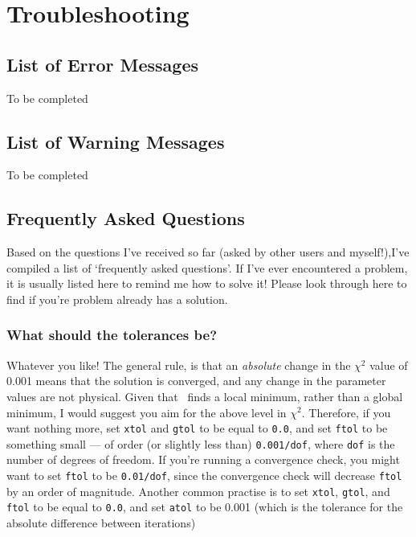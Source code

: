 \section{Troubleshooting}
\label{sec:troubleshoot}

\subsection{List of Error Messages}

To be completed

\subsection{List of Warning Messages}

To be completed

\subsection{Frequently Asked Questions}

Based on the questions I've received so far (asked by other
users and myself!),I've compiled a list of `frequently asked
questions'. If I've ever encountered a problem, it is usually
listed here to remind me how to solve it! Please look through
here to find if you're problem already has a solution.

\subsubsection{What should the tolerances be?}
Whatever you like! The general rule, is that an \textit{absolute}
change in the $\chi^{2}$ value of 0.001 means that the solution
is converged, and any change in the parameter values are not
physical. Given that \alis\ finds a local minimum, rather than a
global minimum, I would suggest you aim for the above level
in $\chi^{2}$. Therefore, if you want nothing more, set \texttt{xtol}
and \texttt{gtol} to be equal to \texttt{0.0}, and set \texttt{ftol} to be
something small --- of order (or slightly less than) \texttt{0.001/dof},
where \texttt{dof} is the number of degrees of freedom. If you're
running a convergence check, you might want to set \texttt{ftol}
to be \texttt{0.01/dof}, since the convergence check will decrease
\texttt{ftol} by an order of magnitude. Another common practise is
to set \texttt{xtol}, \texttt{gtol}, and \texttt{ftol} to be equal to \texttt{0.0},
and set \texttt{atol} to be 0.001 (which is the tolerance for the
absolute difference between iterations)

